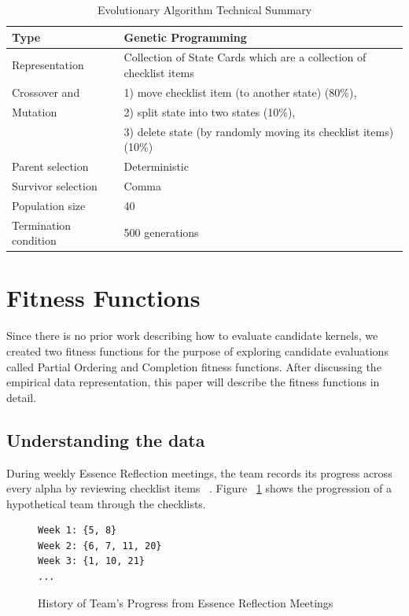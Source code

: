 \documentclass[conference]{IEEEtran}
\begin{document}
\begin{table}[h]
\caption{Evolutionary Algorithm Technical Summary}
\label{TechnicalSummary}
\centering
\begin{tabular}{|p{0.80in}|p{2.30in}|}
\hline
{Type}  & {Genetic Programming} \\ \hline
{Representation} & {Collection of State Cards which are a collection of checklist items}  \\ \hline
{Crossover and} & {1) move checklist item (to another state) (80\%), } \\
{Mutation} & {2) split state into two states (10\%), } \\ 
{} & {3) delete state (by randomly moving its checklist items) (10\%) } \\ \hline
{Parent selection} & {Deterministic} \\ \hline
{Survivor selection}  & {Comma} \\ \hline
{Population size}  & {40} \\ \hline
{Termination \mbox{condition}} & {500 generations} \\ \hline
\end{tabular}
\end{table}

\section{Fitness Functions}

Since there is no prior work describing how to evaluate candidate kernels, we created two fitness functions for the purpose of exploring candidate evaluations called Partial Ordering and Completion fitness functions. After discussing the empirical data representation, this paper will describe the fitness functions in detail. 

\subsection{Understanding the data}

During weekly Essence Reflection meetings, the team records its progress across every alpha by reviewing checklist items ~\cite{ICSE2014}. Figure ~\ref{history} shows the progression of a hypothetical team through the checklists.

\begin{figure}[!htb]
\begin{verbatim}
Week 1: {5, 8}
Week 2: {6, 7, 11, 20} 
Week 3: {1, 10, 21} 
...
\end{verbatim}
 \caption{History of Team's Progress from Essence Reflection Meetings}
 \label{history}
\end{figure}
\end{document}

